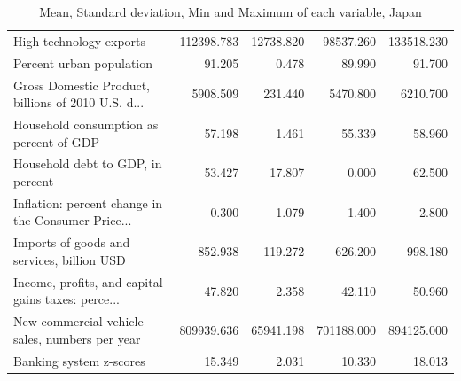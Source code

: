 \documentclass[11pt]{article}
\begin{document}
\begin{table}[H]
{\begin{tabular}{lrrrr}
High technology exports                            &  112398.783 &  12738.820 &   98537.260 &  133518.230 \\
Percent urban population                           &      91.205 &      0.478 &      89.990 &      91.700 \\
Gross Domestic Product, billions of 2010 U.S. d... &    5908.509 &    231.440 &    5470.800 &    6210.700 \\
Household consumption as percent of GDP            &      57.198 &      1.461 &      55.339 &      58.960 \\
Household debt to GDP, in percent                  &      53.427 &     17.807 &       0.000 &      62.500 \\
Inflation: percent change in the Consumer Price... &       0.300 &      1.079 &      -1.400 &       2.800 \\
Imports of goods and services, billion USD         &     852.938 &    119.272 &     626.200 &     998.180 \\
Income, profits, and capital gains taxes: perce... &      47.820 &      2.358 &      42.110 &      50.960 \\
New commercial vehicle sales, numbers per year     &  809939.636 &  65941.198 &  701188.000 &  894125.000 \\
Banking system z-scores                            &      15.349 &      2.031 &      10.330 &      18.013 \\
\bottomrule
\end{tabular}}
\caption{Mean, Standard deviation, Min and Maximum of each variable, Japan}
\label{tab:describe_jpn}
\end{table}
\end{document}

